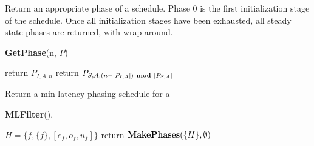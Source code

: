 \begin{algorithm}
\label{alg:get-phase} \caption{Return an appropriate phase of a
schedule.  Phase 0 is the first initialization stage of the
schedule.  Once all initialization stages have been exhausted, all
steady state phases are returned, with wrap-around.} {\bf
GetPhase}(n, $P$)
\begin{algorithmic}
\STATE return $P_{I, A, n}$
\ELSE
\STATE return $P_{S, A, (n - |P_{I,A}|) {\bf\ mod\ } |P_{S, A}|}$
\ENDIF
\end{algorithmic}
\end{algorithm}


\begin{algorithm}
\label{alg:min-lat-filter} \caption{Return a min-latency phasing
schedule for a {\filter}} {\bf MLFilter}().
\begin{algorithmic}
\STATE $H = \{f, \{f\}, [e_f, o_f,u_f]\}$
\STATE return ${\bf MakePhases} (\{H\}, \emptyset)$
\end{algorithmic}
\end{algorithm}


